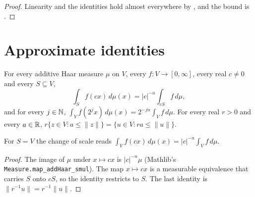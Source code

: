 \begin{proof}
\leanok
Linearity and the identities hold almost everywhere by , and the bound is
.
\end{proof}

\section{Approximate identities}

\begin{lemma}
\label{lem:change-of-scale}
\leanok
For every additive Haar measure $\mu$ on $V$, every $f \colon V \to [0, \infty]$, every real
$c \neq 0$ and every $S \subseteq V$,
\[
  \int_S f(c x) \, d\mu(x) = |c|^{-n} \int_{c S} f \, d\mu ,
\]
and for every $j \in \mathbb{N}$, $\int_V f(2^j x) \, d\mu(x) = 2^{-jn} \int_V f \, d\mu$. For every real
$r > 0$ and every $a \in \mathbb{R}$, $r \{z \in V : a \leq \|z\|\} = \{u \in V : r a \leq \|u\|\}$.
\end{lemma}

For $S = V$ the change of scale reads $\int_V f(c x) \, d\mu(x) = |c|^{-n} \int_V f \, d\mu$.

\begin{proof}
\leanok
The image of $\mu$ under $x \mapsto c x$ is $|c|^{-n} \mu$ (Mathlib's
\texttt{Measure.\allowbreak map\_\allowbreak addHaar\_\allowbreak smul}). The map
$x \mapsto c x$ is a measurable equivalence that carries $S$ onto $c S$, so the identity
restricts to $S$. The last identity is $\|r^{-1} u\| = r^{-1} \|u\|$.
\end{proof}

